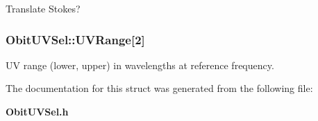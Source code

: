Translate Stokes? 

\subsubsection{ {\bf Obit\-UVSel::UVRange}[2]}\label{structObitUVSel_o32}


UV range (lower, upper) in wavelengths at reference frequency. 



The documentation for this struct was generated from the following file:\begin{CompactItemize}
\item 
{\bf Obit\-UVSel.h}\end{CompactItemize}
